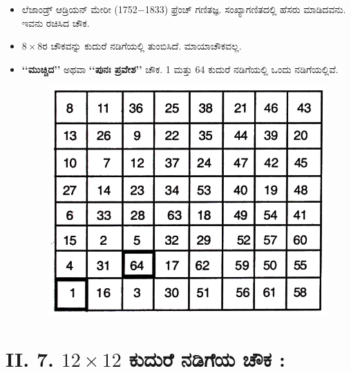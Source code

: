 \begin{itemize}
	\item ಲೆಜಾಂಡ್ರ್ ಆಡ್ರಿಯನ್ ಮೇರೀ (1752$-$1833) ಫ್ರೆಂಚ್ ಗಣಿತಜ್ಞ. ಸಂಖ್ಯಾಗಣಿತ\break ದಲ್ಲಿ ಹೆಸರು ಮಾಡಿದವನು. ಇವನು ರಚಿಸಿದ ಚೌಕ.
	\item $8 \times 8$ರ ಚೌಕವನ್ನು ಕುದುರೆ ನಡಿಗೆಯಲ್ಲಿ ತುಂಬಿಸಿದೆ. ಮಾಯಾಚೌಕವಲ್ಲ.
	\item \textbf{‘‘ಮುಚ್ಚಿದ’’} ಅಥವಾ  \textbf{‘‘ಪುನಃ ಪ್ರವೇಶ’’} ಚೌಕ. 1 ಮತ್ತು 64 ಕುದುರೆ ನಡಿಗೆಯಲ್ಲಿ ಒಂದು ನಡಿಗೆಯಲ್ಲಿವೆ.
	\begin{figure}[H]
	\includegraphics[scale=.9]{src/figures/chap6/fig6-9.jpg}
	\end{figure}
\end{itemize}

\section*{II. 7. $12 \times 12$ ಕುದುರೆ ನಡಿಗೆಯ ಚೌಕ :}

